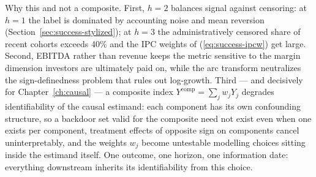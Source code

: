 Why this and not a composite. First, $h=2$ balances signal against censoring: at $h=1$
the label is dominated by accounting noise and mean reversion
(Section~\ref{sec:success-stylized}); at $h=3$ the administratively censored share of
recent cohorts exceeds 40\% and the IPC weights of (\ref{eq:success-ipcw}) get large.
Second, EBITDA rather than revenue keeps the metric sensitive to the margin dimension
investors are ultimately paid on, while the arc transform neutralizes the
sign-definedness problem that rules out log-growth. Third --- and decisively for
Chapter~\ref{ch:causal} --- a composite index $Y^{\mathrm{comp}} = \sum_j w_j Y_j$
degrades identifiability of the causal estimand: each component has its own confounding
structure, so a backdoor set valid for the composite need not exist even when one exists
per component, treatment effects of opposite sign on components cancel
uninterpretably, and the weights $w_j$ become untestable modelling choices sitting
inside the estimand itself. One outcome, one horizon, one information date: everything
downstream inherits its identifiability from this choice.
